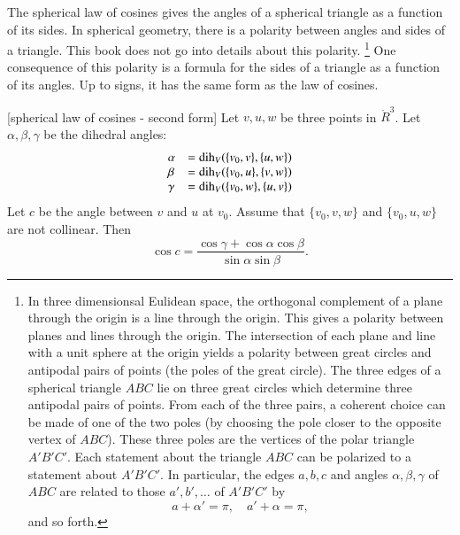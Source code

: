The spherical law of cosines gives the angles of a spherical
triangle as a function of its sides.  In spherical geometry,
there is a polarity between angles and sides of a triangle.
This book does not go into details about this polarity.%
\footnote{In three dimensionsal Eulidean space, the orthogonal
complement of a plane through the origin is a line through
the origin.  This gives a polarity between planes and lines
through the origin.  The intersection of each plane and line with
a unit sphere at the origin yields a polarity between great
circles and antipodal
pairs of points (the poles of the great circle).  The three edges
of a spherical triangle $ABC$ lie on three great circles which
determine three
antipodal pairs of points.  From each of the three  pairs, 
a coherent
choice can be made of one of the two poles (by choosing the pole
closer to the opposite vertex of $ABC$).  
These three poles are the vertices
of the polar triangle $A'B'C'$.  Each statement about the triangle $ABC$
can be polarized to a statement about $A'B'C'$.
In particular, the edges $a,b,c$ and angles $\alpha,\beta,\gamma$ of $ABC$ 
are related to those $a',b',\ldots$ of $A'B'C'$ by
   $$
   a + \alpha' = \pi,\quad a' + \alpha= \pi,
   $$
and so forth.
}  %
One
consequence of this polarity is a formula for the sides of
a triangle as a function of its angles.  Up to signs,
it has the same form as the law of cosines.
%

\begin{lemma}[spherical law of cosines - second form]
Let $v,u,w$ be three points in $\ring{R}^3$.
Let $\alpha,\beta,\gamma$ be the dihedral angles: 
   $$
   \begin{array}{lll}
     \alpha &= \operatorname{dih}_V(\{v_0,v\},\{u,w\})\\
     \beta &= \operatorname{dih}_V(\{v_0,u\},\{v,w\})\\
     \gamma&= \operatorname{dih}_V(\{v_0,w\},\{u,v\})\\
     \end{array}
   $$
Let $c$ be the
angle between $v$ and $u$ at $v_0$. 
Assume that $\{v_0,v,w\}$ and $\{v_0,u,w\}$ are not collinear.
Then
    $$
    \cos c = \frac{\cos \gamma + \cos \alpha \cos \beta}
     {\sin \alpha\sin \beta}.
    $$
\end{lemma}
%
%


